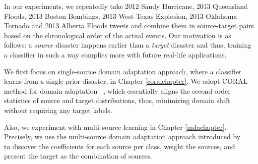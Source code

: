 In our experiments, we repeatedly take 2012 Sandy Hurricane, 2013 Queensland Floods, 2013 Boston Bombings, 2013 West Texas Explosion, 2013 Oklahoma Tornado and 2013 Alberta Floods tweets and combine them in source-target pairs based on the chronological order of the actual events. Our motivation is as follows: a \textit{source} disaster happens earlier than a \textit{target} disaster and thus, training a classifier in such a way complies more with future real-life applications. 

We first focus on single-source domain adaptation approach, where a classifier learns from a single prior disaster, in Chapter \ref{coralchapter}. We adopt CORAL method for domain adaptation ~\citep{coral}, which essentially aligns the second-order statistics of source and target distributions, thus, minimizing domain shift without requiring any target labels. 

Also, we experiment with multi-source learning in Chapter \ref{mdachapter}. Precisely, we use the multi-source domain adaptation approach introduced by ~\citet{mda} to discover the coefficients for each source per class, weight the sources, and present the target as the combination of sources. 

